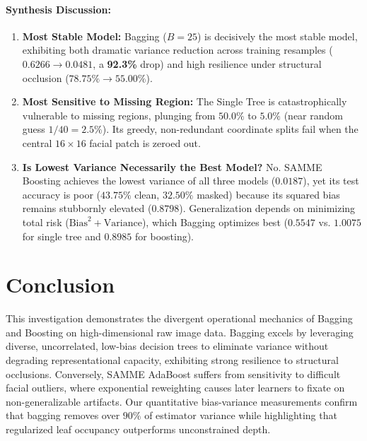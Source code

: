 \documentclass[10pt,twocolumn,letterpaper]{article}
\begin{document}
\paragraph{Synthesis Discussion:}
\begin{enumerate}[leftmargin=*]
    \item \textbf{Most Stable Model:} Bagging ($B=25$) is decisively the most stable model, exhibiting both dramatic variance reduction across training resamples ($0.6266 \to 0.0481$, a \textbf{92.3\%} drop) and high resilience under structural occlusion ($78.75\% \to 55.00\%$).
    \item \textbf{Most Sensitive to Missing Region:} The Single Tree is catastrophically vulnerable to missing regions, plunging from $50.0\%$ to $5.0\%$ (near random guess $1/40 = 2.5\%$). Its greedy, non-redundant coordinate splits fail when the central $16 \times 16$ facial patch is zeroed out.
    \item \textbf{Is Lowest Variance Necessarily the Best Model?} No. SAMME Boosting achieves the lowest variance of all three models ($0.0187$), yet its test accuracy is poor ($43.75\%$ clean, $32.50\%$ masked) because its squared bias remains stubbornly elevated ($0.8798$). Generalization depends on minimizing total risk ($\text{Bias}^2 + \text{Variance}$), which Bagging optimizes best ($0.5547$ vs. $1.0075$ for single tree and $0.8985$ for boosting).
\end{enumerate}

\section{Conclusion}
This investigation demonstrates the divergent operational mechanics of Bagging and Boosting on high-dimensional raw image data. Bagging excels by leveraging diverse, uncorrelated, low-bias decision trees to eliminate variance without degrading representational capacity, exhibiting strong resilience to structural occlusions. Conversely, SAMME AdaBoost suffers from sensitivity to difficult facial outliers, where exponential reweighting causes later learners to fixate on non-generalizable artifacts. Our quantitative bias-variance measurements confirm that bagging removes over $90\%$ of estimator variance while highlighting that regularized leaf occupancy outperforms unconstrained depth.

{\small


}
\end{document}
